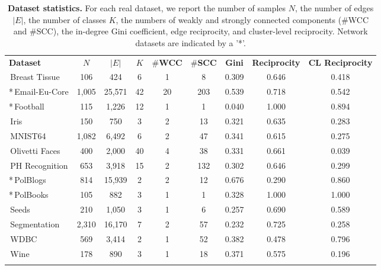 \begin{table}[t]\small
  \centering
  \caption{\textbf{Dataset statistics.} For each real dataset, we report the number of samples $N$, the number of edges $|E|$, the number of classes $K$, the numbers of weakly and strongly connected components (\#WCC and \#SCC), the in-degree Gini coefficient, edge reciprocity, and cluster-level reciprocity. Network datasets are indicated by a '*'.}
  \label{tab:dataset_stats}
  \begin{tabular}{l|ccc|cc|ccc}
    \Xhline{2\arrayrulewidth}
    \textbf{Dataset} & $N$ & $|E|$ & $K$ & \#\textbf{WCC} & \#\textbf{SCC} & \textbf{Gini} & \textbf{Reciprocity} & \textbf{CL Reciprocity} \\
    \Xhline{2\arrayrulewidth}
    \phantom{*}\,Breast Tissue & 106 & 424 & 6 & 1 & 8 & 0.309 & 0.646 & 0.418 \\
    *\,Email-Eu-Core & 1,005 & 25,571 & 42 & 20 & 203 & 0.539 & 0.718 & 0.542 \\
    *\,Football & 115 & 1,226 & 12 & 1 & 1 & 0.040 & 1.000 & 0.894 \\
    \phantom{*}\,Iris & 150 & 750 & 3 & 2 & 13 & 0.321 & 0.635 & 0.283 \\
    \phantom{*}\,MNIST64 & 1,082 & 6,492 & 6 & 2 & 47 & 0.341 & 0.615 & 0.275 \\
    \phantom{*}\,Olivetti Faces & 400 & 2,000 & 40 & 4 & 38 & 0.331 & 0.661 & 0.039 \\
    \phantom{*}\,PH Recognition & 653 & 3,918 & 15 & 2 & 132 & 0.302 & 0.646 & 0.299 \\
    *\,PolBlogs & 814 & 15,939 & 2 & 2 & 12 & 0.676 & 0.290 & 0.860 \\
    *\,PolBooks & 105 & 882 & 3 & 1 & 1 & 0.328 & 1.000 & 1.000 \\
    \phantom{*}\,Seeds & 210 & 1,050 & 3 & 1 & 6 & 0.257 & 0.690 & 0.589 \\
    \phantom{*}\,Segmentation & 2,310 & 16,170 & 7 & 2 & 57 & 0.232 & 0.725 & 0.258 \\
    \phantom{*}\,WDBC & 569 & 3,414 & 2 & 1 & 52 & 0.382 & 0.478 & 0.796 \\
    \phantom{*}\,Wine & 178 & 890 & 3 & 1 & 18 & 0.371 & 0.575 & 0.196 \\
    \Xhline{2\arrayrulewidth}
  \end{tabular}
\end{table}